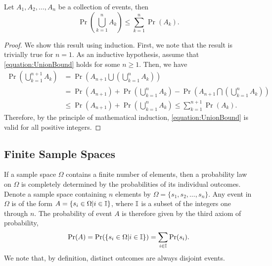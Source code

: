 \begin{theorem}
Let $A_1, A_2, \ldots, A_n$ be a collection of events, then
\begin{equation} \label{equation:UnionBound}
\Pr \left( \bigcup_{k=1}^{n} A_k \right)
\leq \sum_{k = 1}^{n} \Pr (A_k) .
\end{equation}
\end{theorem}
\begin{proof}
We show this result using induction.
First, we note that the result is trivially true for $n = 1$.
As an inductive hypothesis, assume that \eqref{equation:UnionBound} holds for some $n \geq 1$.
Then, we have
\begin{equation*}
\begin{split}
\Pr \left( \bigcup_{k=1}^{n+1} A_k \right)
&= \Pr \left( A_{n+1} \bigcup \left( \bigcup_{k=1}^{n} A_k \right) \right) \\
&= \Pr (A_{n+1}) + \Pr \left( \bigcup_{k=1}^{n} A_k \right)
- \Pr \left( A_{n+1} \bigcap \left( \bigcup_{k=1}^{n} A_k \right) \right) \\
&\leq \Pr (A_{n+1}) + \Pr \left( \bigcup_{k=1}^{n} A_k \right)
\leq \sum_{k = 1}^{n+1} \Pr (A_k) .
\end{split}
\end{equation*}
Therefore, by the principle of mathematical induction, \eqref{equation:UnionBound} is valid for all positive integers.
\end{proof}


\subsection{Finite Sample Spaces}
\label{section:FiniteSampleSpaces}

If a sample space $\Omega$ contains a finite number of elements, then a probability law on $\Omega$ is completely determined by the probabilities of its individual outcomes.
Denote a sample space containing $n$ elements by $\Omega = \{ s_1, s_2, \ldots, s_n \}$.
Any event in $\Omega$ is of the form $A = \{ s_i \in \Omega | i \in \mathbb{I} \}$, where $\mathbb{I}$ is a subset of the integers one through $n$.
The probability of event $A$ is therefore given by the third axiom of probability,
\begin{equation*}
\Pr (A)
= \Pr ( \{ s_i \in \Omega | i \in \mathbb{I} \} )
= \sum_{i \in \mathbb{I}} \Pr (s_i) .
\end{equation*}
We note that, by definition, distinct outcomes are always disjoint events.


